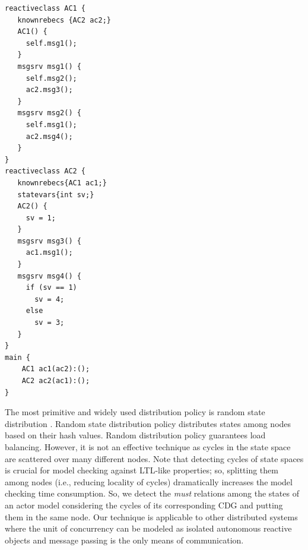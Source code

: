 \begin{lstlisting}[language=rebeca, caption= A simple actor model, label=src::actor-model]
reactiveclass AC1 {
   knownrebecs {AC2 ac2;}
   AC1() {
     self.msg1();
   }
   msgsrv msg1() {
     self.msg2();
     ac2.msg3();
   }
   msgsrv msg2() {
     self.msg1();
     ac2.msg4();
   }
}
reactiveclass AC2 {
   knownrebecs{AC1 ac1;}
   statevars{int sv;}
   AC2() {
     sv = 1;
   }
   msgsrv msg3() {
     ac1.msg1();
   }
   msgsrv msg4() {
     if (sv == 1)
       sv = 4;
     else
       sv = 3;
   }
}
main {
    AC1 ac1(ac2):();
    AC2 ac2(ac1):();
}
\end{lstlisting}

The most primitive and widely used distribution policy is random state distribution \cite{DBLP:journals/entcs/GaravelMS13}. Random state distribution policy distributes states among nodes based on their hash values. Random distribution policy guarantees load balancing. However, it is not an effective technique as cycles in the state space are scattered over many different nodes. Note that detecting cycles of state spaces is crucial for model checking against LTL-like properties; so, splitting them among nodes (i.e., reducing locality of cycles) dramatically increases the model checking time consumption. %
So, we detect the \emph{must} relations among the states of an actor model considering the cycles of its corresponding CDG and putting them in the same node. Our technique is applicable to other distributed systems where the unit of concurrency can be modeled as isolated autonomous reactive objects and message passing is the only means of communication. 

